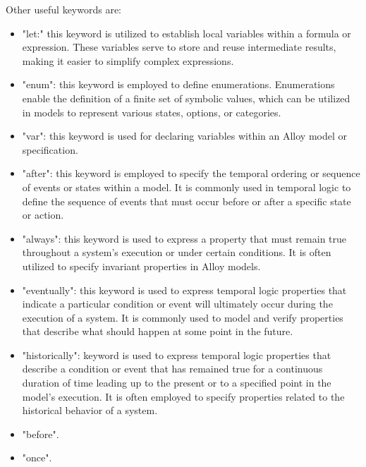     Other useful keywords are: 
    \begin{itemize}
        \item "let:" this keyword is utilized to establish local variables within a formula or expression. 
            These variables serve to store and reuse intermediate results, making it easier to simplify complex expressions.
        \item "enum": this keyword is employed to define enumerations. 
            Enumerations enable the definition of a finite set of symbolic values, which can be utilized in models to represent various states, options, or categories.
        \item "var": this keyword is used for declaring variables within an Alloy model or specification.
        \item "after": this keyword is employed to specify the temporal ordering or sequence of events or states within a model. 
            It is commonly used in temporal logic to define the sequence of events that must occur before or after a specific state or action.
        \item "always": this keyword is used to express a property that must remain true throughout a system's execution or under certain conditions.
            It is often utilized to specify invariant properties in Alloy models.
        \item "eventually": this keyword is used to express temporal logic properties that indicate a particular condition or event will ultimately occur during the execution of a system. 
            It is commonly used to model and verify properties that describe what should happen at some point in the future.
        \item "historically": keyword is used to express temporal logic properties that describe a condition or event that has remained true for a continuous duration of time leading up to the present or to a specified point in the model's execution.
            It is often employed to specify properties related to the historical behavior of a system.
        \item "before". 
        \item "once".
    \end{itemize}